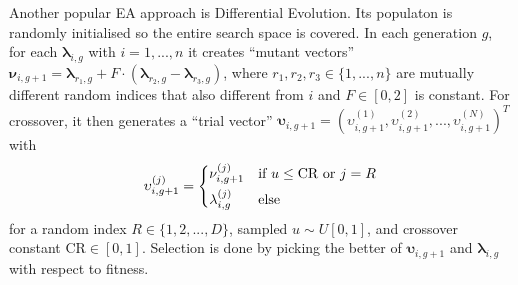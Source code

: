 \documentclass[twoside,11pt]{article}
\begin{document}
Another popular EA approach is Differential Evolution. Its populaton is randomly initialised so the entire search space is covered.
In each generation $g$, for each $\boldsymbol\lambda_{i,g}$ with $i=1,...,n$ it creates ``mutant vectors''
$\boldsymbol\nu_{i,g+1}=\boldsymbol\lambda_{r_1,g}+F\cdot(\boldsymbol\lambda_{r_2,g}-\boldsymbol\lambda_{r_3,g})$,
where $r_1,r_2,r_3\in\{1,...,n\}$ are mutually different random indices that also different from $i$ and $F\in[0,2]$ is constant.
For crossover, it then generates a ``trial vector'' $\boldsymbol\upsilon_{i,g+1}=(\upsilon_{i,g+1}^{(1)},\upsilon_{i,g+1}^{(2)},...,\upsilon_{i,g+1}^{(N)})^T$ with
\begin{equation}
  \upsilon_{i,g+1}^{(j)} = \begin{dcases}
    \nu_{i,g+1}^{(j)} & \text{if } u\le\text{CR}\text{ or } j=R \\
    \lambda_{i,g}^{(j)} & \text{else}
  \end{dcases}
\end{equation}
for a random index $R\in\{1,2,...,D\}$, sampled $u\sim U[0,1]$, and crossover constant $\text{CR}\in[0,1]$.
Selection is done by picking the better of $\boldsymbol\upsilon_{i,g+1}$ and $\boldsymbol\lambda_{i,g}$ with respect to fitness. \citep[p. 343]{differential_evolution}
\end{document}
